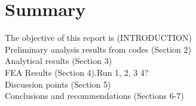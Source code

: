 \chapter{Summary}

The objective of this report is (INTRODUCTION)\\

Preliminary analysis results from codes (Section 2)\\ 

Analytical results (Section 3)\\

FEA Results (Section 4).Run 1, 2, 3 4?\\	

Discussion points (Section 5)\\

Conclusions and recommendations (Sections 6-7)


